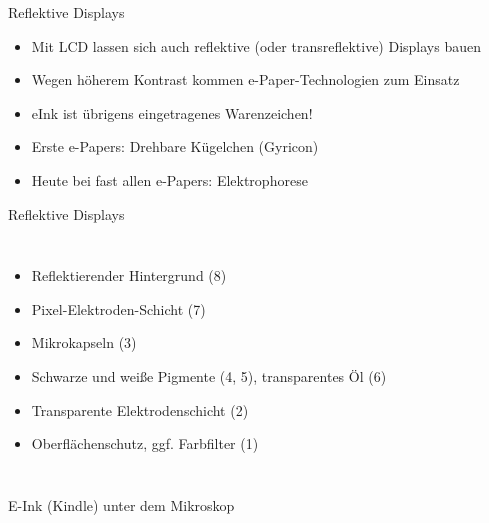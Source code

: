 \documentclass[hyperref={pdfpagelabels=false}]{beamer}
\begin{document}
\begin{frame}{Reflektive Displays}
	\begin{itemize}
		\item Mit LCD lassen sich auch reflektive (oder transreflektive) Displays bauen
		\item Wegen höherem Kontrast kommen e-Paper-Technologien zum Einsatz
		\item eInk ist übrigens eingetragenes Warenzeichen!
		\item Erste e-Papers: Drehbare Kügelchen (Gyricon)
		\item Heute bei fast allen e-Papers: Elektrophorese
	\end{itemize}
\end{frame}

\begin{frame}{Reflektive Displays}
	\begin{columns}
			\begin{itemize}
				\item Reflektierender Hintergrund (8)
				\item Pixel-Elektroden-Schicht (7)
				\item Mikrokapseln (3)
				\item Schwarze und weiße Pigmente (4, 5), transparentes Öl (6)
				\item Transparente Elektrodenschicht (2)
				\item Oberflächenschutz, ggf. Farbfilter (1)
			\end{itemize}
	\end{columns}
\end{frame}

\begin{frame}{E-Ink (Kindle) unter dem Mikroskop}
	\begin{center}
	\end{center}
\end{frame}
\end{document}
